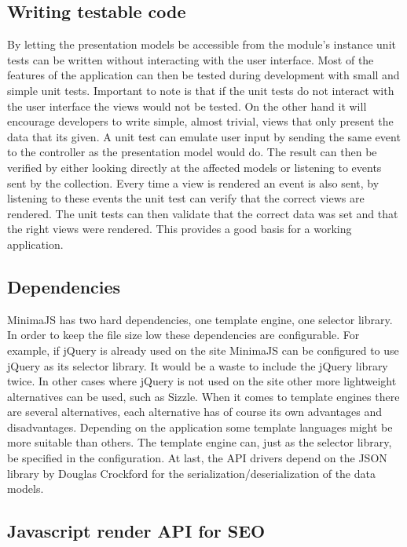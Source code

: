 \subsection{Writing testable code}

By letting the presentation models be accessible from the module's instance unit tests can be written without interacting with the user interface. Most of the features of the application can then be tested during development with small and simple unit tests. Important to note is that if the unit tests do not interact with the user interface the views would not be tested. On the other hand it will encourage developers to write simple, almost trivial, views that only present the data that its given. A unit test can emulate user input by sending the same event to the controller as the presentation model would do. The result can then be verified by either looking directly at the affected models or listening to events sent by the collection. Every time a view is rendered an event is also sent, by listening to these events the unit test can verify that the correct views are rendered. The unit tests can then validate that the correct data was set and that the right views were rendered. This provides a good basis for a working application.

\subsection{Dependencies}

MinimaJS has two hard dependencies, one template engine, one selector library. In order to keep the file size low these dependencies are configurable. For example, if jQuery is already used on the site MinimaJS can be configured to use jQuery as its selector library. It would be a waste to include the jQuery library twice. In other cases where jQuery is not used on the site other more lightweight alternatives can be used, such as Sizzle. When it comes to template engines there are several alternatives, each alternative has of course its own advantages and disadvantages. Depending on the application some template languages might be more suitable than others. The template engine can, just as the selector library, be specified in the configuration. At last, the API drivers depend on the JSON library by Douglas Crockford \cite{json} for the serialization/deserialization of the data models.

\subsection{Javascript render API for SEO}

